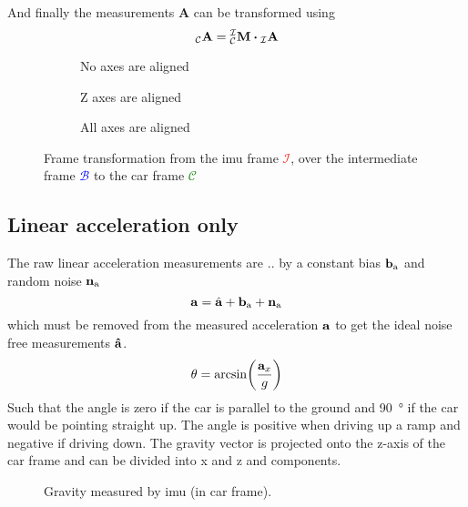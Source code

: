 And finally the measurements $\mathbf{A}$ can be transformed using
\begin{equation}
    \vincs{A}{c} = \mtf{i}{c} \vdot \vincs{A}{i}
\end{equation}
\begin{figure}[htb]
    \centering
    \begin{subfigure}[b]{0.3\textwidth}
        \centering
        
        \caption{No axes are aligned}
        \label{fig:tikz_frame_transformation_init}
    \end{subfigure}
    \hfill
    \begin{subfigure}[b]{0.3\textwidth}
        \centering
        
        \caption{Z axes are aligned}
        \label{fig:tikz_frame_transformation_intermediate}
    \end{subfigure}
    \hfill
    \begin{subfigure}[b]{0.3\textwidth}
        \centering
        
        \caption{All axes are aligned}
        \label{fig:tikz_frame_transformation_final}
    \end{subfigure}
    \caption[Frame transformation]{Frame transformation from the \gls{imu} frame \textcolor{red}{$\mathcal{I}$}, over the intermediate frame \textcolor{blue}{$\mathcal{B}$} to the car frame \textcolor{green}{$\mathcal{C}$}}
    \label{fig:tikz_frame_transformation}
\end{figure}


\subsection{Linear acceleration only}
The raw linear acceleration measurements are .. by a constant bias $\vb{b}_\mathrm{a}$ and random noise $\vb{n}_\mathrm{a}$
\begin{equation}
    \vb{a} = \hat{\vb{a}} + \vb{b}_\mathrm{a} + \vb{n}_\mathrm{a}
\end{equation}
which must be removed from the measured acceleration $\vb{a}$ to get the ideal noise free measurements $\vb{\hat{a}}$.
\begin{equation}
    \theta = \arcsin(\frac{\vb{a}_x}{g})
\end{equation}
Such that the angle is zero if the car is parallel to the ground and \SI{90}{\degree} if the car would be pointing straight up.
The angle is positive when driving up a ramp and negative if driving down.
The gravity vector is projected onto the z-axis of the car frame and can be divided into x and z and components.
\begin{figure}[htpb]
    \centering
    
    \caption{Gravity measured by \acrshort{imu} (in car frame).}
    \label{fig:tikz_car_gravity1}
\end{figure}


